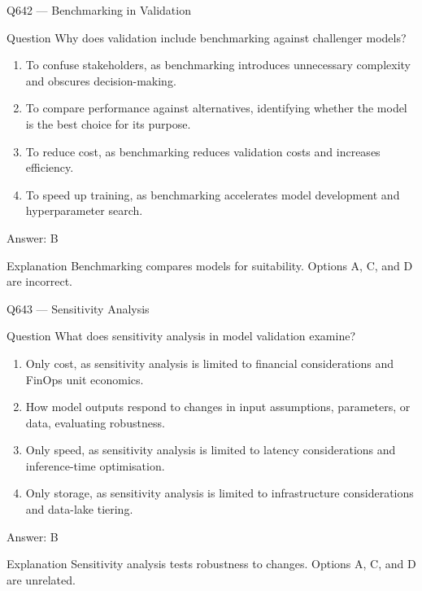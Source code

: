 \documentclass[aspectratio=169,8pt]{beamer}
\begin{document}
	\begin{frame}{Q642 --- Benchmarking in Validation}
		\begin{block}{Question}
			Why does validation include benchmarking against challenger models?
			\begin{enumerate}
				\item To confuse stakeholders, as benchmarking introduces unnecessary complexity and obscures decision-making.
				\item To compare performance against alternatives, identifying whether the model is the best choice for its purpose.
				\item To reduce cost, as benchmarking reduces validation costs and increases efficiency.
				\item To speed up training, as benchmarking accelerates model development and hyperparameter search.
			\end{enumerate}
		\end{block}
		\begin{exampleblock}{Answer: B}\end{exampleblock}
		\begin{block}{Explanation}
			Benchmarking compares models for suitability. Options A, C, and D are incorrect.
		\end{block}
	\end{frame}
	
	\begin{frame}{Q643 --- Sensitivity Analysis}
		\begin{block}{Question}
			What does sensitivity analysis in model validation examine?
			\begin{enumerate}
				\item Only cost, as sensitivity analysis is limited to financial considerations and FinOps unit economics.
				\item How model outputs respond to changes in input assumptions, parameters, or data, evaluating robustness.
				\item Only speed, as sensitivity analysis is limited to latency considerations and inference-time optimisation.
				\item Only storage, as sensitivity analysis is limited to infrastructure considerations and data-lake tiering.
			\end{enumerate}
		\end{block}
		\begin{exampleblock}{Answer: B}\end{exampleblock}
		\begin{block}{Explanation}
			Sensitivity analysis tests robustness to changes. Options A, C, and D are unrelated.
		\end{block}
	\end{frame}
	
\end{document}
